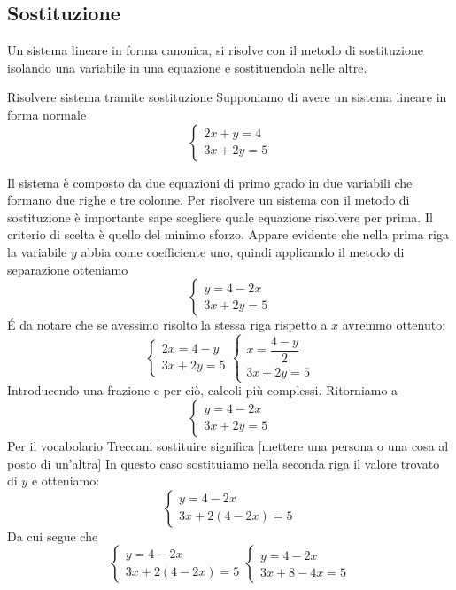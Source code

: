 \subsection{Sostituzione}
\label{sec:Sostituzione}
Un sistema lineare in forma canonica, si risolve con il metodo di sostituzione isolando una variabile in una equazione e sostituendola nelle altre. 
\begin{esempiot}{Risolvere sistema tramite sostituzione}{}
	Supponiamo di avere un sistema lineare in forma normale
	\[
	\begin{cases}
	2x+y=4\\
	3x+2y=5
	\end{cases}
	\]
\end{esempiot}
Il sistema è composto da due equazioni di primo grado in due variabili che formano due righe e tre colonne. Per risolvere un sistema con il metodo di sostituzione è importante sape scegliere quale equazione risolvere per prima. Il criterio di scelta è quello del minimo sforzo. Appare evidente che nella prima riga la variabile $y$ abbia come coefficiente  uno, quindi applicando il metodo di separazione otteniamo \[
\begin{cases}
y=4-2x\\
3x+2y=5
\end{cases}
\]
\'E da notare che se avessimo risolto la stessa riga rispetto a $x$ avremmo ottenuto:
\[
\begin{cases}
	2x=4-y\\
	3x+2y=5
\end{cases}
\begin{cases}
	x=\dfrac{4-y}{2}\\
	3x+2y=5
\end{cases}
\]
Introducendo una frazione e per ciò, calcoli più complessi.
Ritorniamo a \[
\begin{cases}
y=4-2x\\
3x+2y=5
\end{cases}
\] Per il vocabolario Treccani sostituire significa [mettere una persona o una cosa al posto di un'altra] In questo caso sostituiamo nella seconda riga il valore trovato di $y$ e otteniamo:
\[
\begin{cases}
y=4-2x\\
3x+2(4-2x)=5
\end{cases}
\]
Da cui segue che 
\[
\begin{cases}
y=4-2x\\
3x+2(4-2x)=5
\end{cases}
\begin{cases}
y=4-2x\\
3x+8-4x=5
\end{cases}
\]
